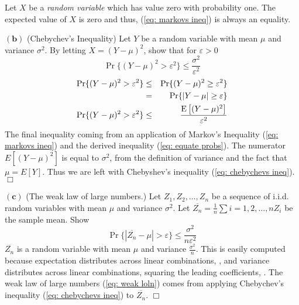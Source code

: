 \documentclass[10pt]{article}
\DeclareMathOperator*{\E}{\mbox{\text{E}}}
\newcommand{\pref}[1]{{(\ref{#1})}}
\begin{document}
\begin{scriptsize}
\begin{multicols}{3}
Let $X$ be a \emph{random variable} which has value zero with probability
one.
The expected value of $X$ is zero and thus, 
\pref{eq: markovs ineq} is always an equality.

$\mathbf{(b)}$
(Chebychev's Inequality) Let $Y$ be a random variable with mean $\mu$ and
variance $\sigma^2$. By letting $X = (Y-\mu)^2$, show that for
$\varepsilon > 0$
\begin{equation}
    \Pr \{(Y-\mu)^2 > \varepsilon^2\} \leq \frac{\sigma^2}{\varepsilon^2}
    \label{eq: chebychevs ineq}
\end{equation}
\proof
\begin{eqnarray}
    \Pr\{(Y-\mu)^2 > \varepsilon^2\} &\leq& \Pr\{(Y-\mu)^2 \geq \varepsilon^2\}
        \nonumber \\
        &=& \Pr\{|Y-\mu| \geq \varepsilon\}
        \label{eq: equate probs} \\
    \Pr \{(Y-\mu)^2 > \varepsilon^2\} &\leq& \frac{\E \big[(Y-\mu)^2\big]}{\varepsilon^2}
        \label{eq:instatiate 3.1a}
\end{eqnarray}
The final inequality coming from an application of Markov's Inequality
\pref{eq: markovs ineq} and the derived inequality \pref{eq: equate probs}.
The numerator $E[(Y-\mu)^2]$ is equal to $\sigma^2$, from the definition
of variance and the fact that $\mu = E[Y]$. Thus we are left with
Chebyshev's inequality \pref{eq: chebychevs ineq}. $\Box$

$\mathbf{(c)}$
(The weak law of large numbers.) Let $Z_1,Z_2,\dots,Z_n$ be a sequence of
i.i.d. random variables with mean $\mu$ and variance $\sigma^2$. Let
$\overline{Z_n} = \frac{1}{n}\sum{i=1,2,\dots,n}Z_i$ be the sample mean.
Show 
\begin{equation}
    \Pr \{|\overline{Z_n} - \mu| > \varepsilon\} \leq
    \frac{\sigma^2}{n\varepsilon^2}
    \label{eq: weak loln}
\end{equation}
\proof
$\overline{Z_n}$ is a random variable with mean $\mu$ and variance
$\frac{\sigma^2}{n}$. This is easily computed because expectation
distributes across linear combinations, 
, and variance distributes across linear combinations, squaring the
leading coefficients,
. The weak law of large numbers \pref{eq: weak loln} comes from applying
Chebychev's inequality \pref{eq: chebychevs ineq} to $\overline{Z_n}$.
$\Box$


\end{multicols}
\end{scriptsize}
\end{document}

